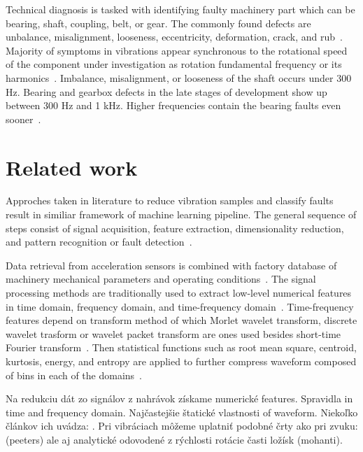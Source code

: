 \documentclass{llncs}
\begin{document}
Technical diagnosis is tasked with identifying faulty machinery part which can be bearing, shaft, coupling, belt, or gear. The commonly found defects are unbalance, misalignment, looseness, eccentricity, deformation, crack, and rub~\cite{mohanty_machinery_2015, scheffer_practical_2004}. Majority of symptoms in vibrations appear synchronous to the rotational speed of the component under investigation as rotation fundamental frequency or its harmonics~\cite{davies_handbook_2012}. Imbalance, misalignment, or looseness of the shaft occurs under 300 Hz. Bearing and gearbox defects in the late stages of development show up between 300 Hz and 1 kHz. Higher frequencies contain the bearing faults even sooner~\cite{torres_automatic_2022}.  



\section{Related work}
Approches taken in literature to reduce vibration samples and classify faults result in similiar framework of machine learning pipeline. The general sequence of steps consist of signal acquisition, feature extraction, dimensionality reduction, and pattern recognition or fault detection~\cite{wang_bearing_2015, brito_fault_2021}. 

Data retrieval from acceleration sensors is combined with factory database of machinery mechanical parameters and operating conditions~\cite{jung_vibration_2017}. The signal processing methods are traditionally used to extract low-level numerical features in time domain, frequency domain, and time-frequency domain~\cite{nandi_condition_2019}. Time-frequency features depend on transform method of which Morlet wavelet transform, discrete wavelet trasform or wavelet packet transform are ones used besides short-time Fourier transform~\cite{maurya_condition-based_2021}. Then statistical functions such as root mean square, centroid, kurtosis, energy, and entropy are applied to further compress waveform composed of bins in each of the domains~\cite{zhuo_research_2022}.




Na redukciu dát zo signálov z nahrávok získame numerické features. Spravidla in time and frequency domain. Najčastejšie štatické vlastnosti of waveform. Niekoľko článkov ich uvádza: . Pri vibráciach môžeme uplatniť podobné črty ako pri zvuku: (peeters) ale aj analytické odovodené z rýchlosti rotácie časti ložísk (mohanti). 
\end{document}
